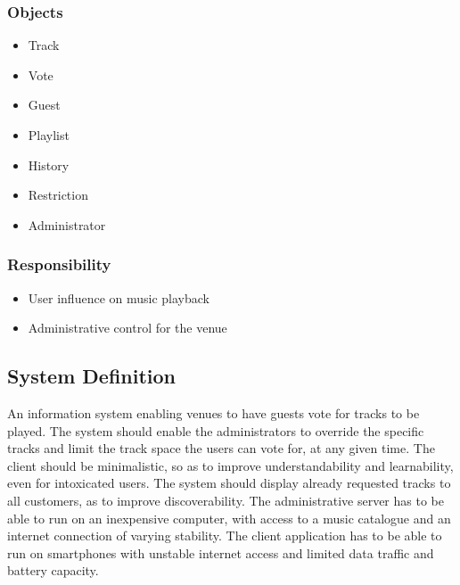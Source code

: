\subsubsection{Objects}
\begin{itemize}
  \item Track
  \item Vote
  \item Guest
  \item Playlist
  \item History
  \item Restriction
  \item Administrator
\end{itemize}

\subsubsection{Responsibility}
\begin{itemize}
  \item User influence on music playback
  \item Administrative control for the venue
\end{itemize}

\subsection{System Definition}
\label{sub:systemDefinition}
An information system enabling venues to have guests vote for tracks to be played. The system should enable the administrators to override the specific tracks and limit the track space the users can vote for, at any given time. The client should be minimalistic, so as to improve understandability and learnability, even for intoxicated users. The system should display already requested tracks to all customers, as to improve discoverability.
The administrative server has to be able to run on an inexpensive computer, with access to a music catalogue and an internet connection of varying stability. The client application has to be able to run on smartphones with unstable internet access and limited data traffic and battery capacity.
